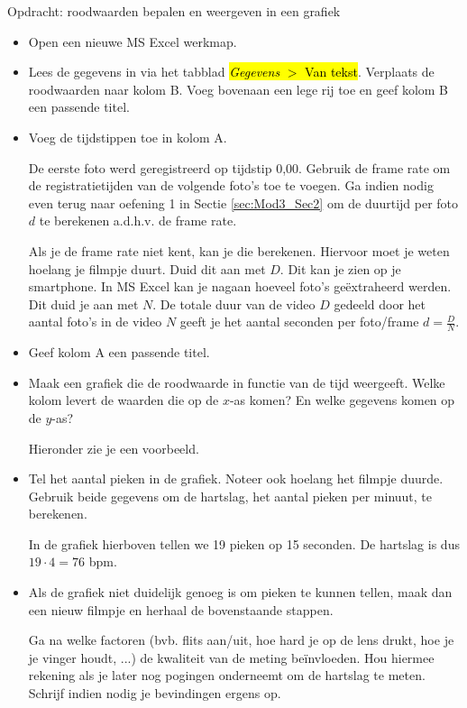 \begin{opdracht}{Opdracht: roodwaarden bepalen en weergeven in een grafiek}
\begin{enumerate}
	\begin{itemize}
		\item Open een nieuwe MS Excel werkmap.
		\item Lees de gegevens in via het tabblad \hl{\emph{Gegevens} $>$ Van tekst}. Verplaats de roodwaarden naar kolom B. Voeg bovenaan een lege rij toe en geef kolom B een passende titel.
		\item Voeg de tijdstippen toe in kolom A. 
			
		De eerste foto werd geregistreerd op tijdstip 0,00. Gebruik de frame rate om de registratietijden van de volgende foto's toe te voegen. Ga indien nodig even terug naar oefening 1 in Sectie \ref{sec:Mod3_Sec2} om de duurtijd per foto $d$ te berekenen a.d.h.v. de frame rate.
			
		Als je de frame rate niet kent, kan je die berekenen. Hiervoor moet je weten hoelang je filmpje duurt. Duid dit aan met $D$. Dit kan je zien op je smartphone. In MS Excel kan je nagaan hoeveel foto's ge\"extraheerd werden. Dit duid je aan met $N$. De totale duur van de video $D$ gedeeld door het aantal foto's in de video $N$ geeft je het aantal seconden per foto/frame $d=\frac{D}{N}$. 
			
		\item Geef kolom A een passende titel.
			
		\item Maak een grafiek die de roodwaarde in functie van de tijd weergeeft. Welke kolom levert de waarden die op de $x$-as komen? En welke gegevens komen op de $y$-as?
			
		Hieronder zie je een voorbeeld.
			
			
		\item Tel het aantal pieken in de grafiek. Noteer ook hoelang het filmpje duurde. Gebruik beide gegevens om de hartslag, het aantal pieken per minuut, te berekenen.
			
		In de grafiek hierboven tellen we 19 pieken op 15 seconden. De hartslag is dus $19 \cdot 4 = 76$ bpm.
			
		\item Als de grafiek niet duidelijk genoeg is om pieken te kunnen tellen, maak dan een nieuw filmpje en herhaal de bovenstaande stappen. 
			
		Ga na welke factoren (bvb. flits aan/uit, hoe hard je op de lens drukt, hoe je je vinger houdt, ...) de kwaliteit van de meting be\"invloeden. Hou hiermee rekening als je later nog pogingen onderneemt om de hartslag te meten. Schrijf indien nodig je bevindingen ergens op.
		\end{itemize}
	

\end{enumerate}
\end{opdracht}
